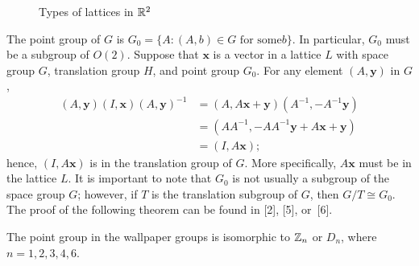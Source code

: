 \begin{figure}[bht]
\begin{center}
\end{center}
\caption{Types of lattices in  ${\Bbb R}^2$}
\label{Types}
\end{figure}
 
 
The point group of $G$ is $G_0 = \{A : (A,b) \in G \mbox{ for some
$b$}  \}$. In particular, $G_0$ must be a subgroup of $O(2)$. Suppose
that ${\mathbf x}$ is a vector in a lattice $L$ with space group $G$,
translation group $H$, and point group $G_0$. For any element $(A,
{\mathbf y})$ in $G$,   
\begin{align*}
(A, {\mathbf y}) (I, {\mathbf x}) (A, {\mathbf y})^{-1}
& =
(A,A {\mathbf x} + {\mathbf y}) (A^{-1},-A^{-1} {\mathbf y}) \\
& =
(A A^{-1},-A A^{-1} {\mathbf y} + A {\mathbf x} + {\mathbf y}) \\
& =
(I, A {\mathbf x});
\end{align*}
hence, $(I, A {\mathbf x})$ is in the translation group of $G$. More
specifically, $A {\mathbf x}$ must be in the lattice $L$. It is
important to note that $G_0$ is not usually a subgroup of the space
group $G$; however, if $T$ is the translation subgroup of $G$, then
$G/T \cong G_0$. The proof of the following theorem can be found in
[2], [5], or~[6].
 
 
 
\begin{theorem}
The point group in the wallpaper groups is isomorphic to ${\Bbb Z}_n$
or $D_n$, where $n = 1, 2, 3, 4, 6$. 
\end{theorem}
 
